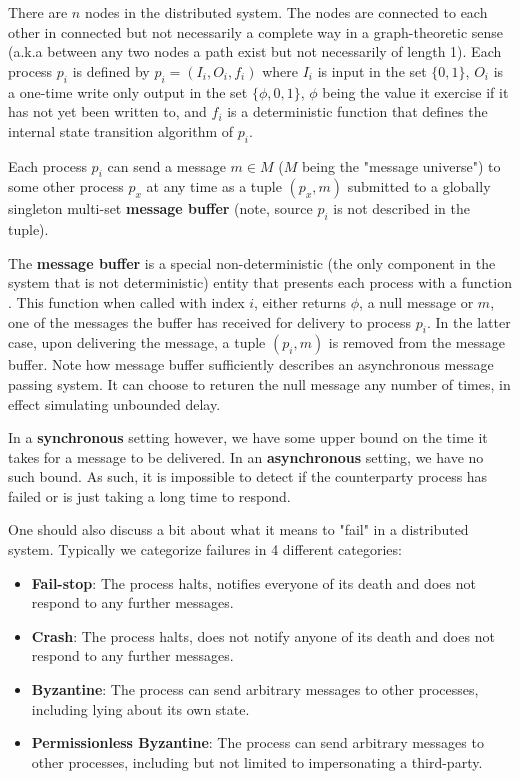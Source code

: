 There are $n$ nodes in the distributed system. The nodes are connected to each other in connected but not necessarily a complete way in a graph-theoretic sense (a.k.a between any two nodes a path exist but not necessarily of length 1). Each process $p_i$ is defined by $p_i = (I_i, O_i, f_i)$ where $I_i$ is input in the set $\{0, 1\}$, $O_i$ is a one-time write only output in the set $\{\phi, 0, 1\}$, $\phi$ being the value it exercise if it has not yet been written to, and $f_i$ is a deterministic function that defines the internal state transition algorithm of $p_i$.

Each process $p_i$ can send a message $m \in M$ ($M$ being the "message universe") to some other process $p_x$ at any time as a tuple $(p_x, m)$ submitted to a globally singleton multi-set \textbf{message buffer} (note, source $p_i$ is not described in the tuple).

The \textbf{message buffer} is a special non-deterministic (the only component in the system that is not deterministic) entity that presents each process with a function . This function when called with index $i$, either returns $\phi$, a null message or $m$, one of the messages the buffer has received for delivery to process $p_i$. In the latter case, upon delivering the message, a tuple $(p_i, m)$ is removed from the message buffer. Note how message buffer sufficiently describes an asynchronous message passing system. It can choose to returen the null message any number of times, in effect simulating unbounded delay.

In a \textbf{synchronous} setting however, we have some upper bound on the time it takes for a message to be delivered. In an \textbf{asynchronous} setting, we have no such bound. As such, it is impossible to detect if the counterparty process has failed or is just taking a long time to respond.

One should also discuss a bit about what it means to "fail" in a distributed system. Typically we categorize failures in 4 different categories:
\begin{itemize}
    \item \textbf{Fail-stop}: The process halts, notifies everyone of its death and does not respond to any further messages.
    \item \textbf{Crash}: The process halts, does not notify anyone of its death and does not respond to any further messages.
    \item \textbf{Byzantine}: The process can send arbitrary messages to other processes, including lying about its own state.
    \item \textbf{Permissionless Byzantine}: The process can send arbitrary messages to other processes, including but not limited to impersonating a third-party.
\end{itemize}

